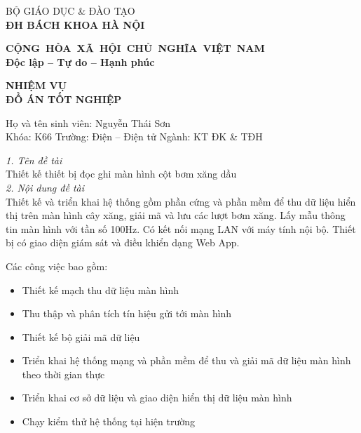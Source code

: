 \begin{multicols}{2}
\centering
\hspace{-3cm}BỘ GIÁO DỤC \& ĐÀO TẠO \\ \hspace{-3cm}\textbf{ĐH BÁCH KHOA HÀ NỘI}

\columnbreak

\hspace{-1.6cm}\textbf{CỘNG~HÒA~XÃ~HỘI~CHỦ~NGHĨA~VIỆT~NAM} \\ \hspace{-1.6cm}\textbf{Độc lập -- Tự do -- Hạnh phúc}

\end{multicols}

\begin{center}
   \textbf{NHIỆM VỤ \\ĐỒ ÁN TỐT NGHIỆP} 
\end{center}


\hspace{-1cm}Họ và tên sinh viên: Nguyễn Thái Sơn\\Khóa: K66 \hfill Trường: Điện -- Điện tử \hfill Ngành: KT ĐK \& TĐH
    
    
    \hspace{-1cm}\textit{1. Tên đề tài}\\
             Thiết kế thiết bị đọc ghi màn hình cột bơm xăng dầu  \\[0.2cm]
    \textit{2. Nội dung đề tài}\\
            Thiết kế và triển khai hệ thống gồm phần cứng và phần mềm
            để thu dữ liệu hiển thị trên màn hình cây xăng, giải mã
            và lưu các lượt bơm xăng. Lấy mẫu thông tin màn hình với tần số 100Hz. Có kết nối mạng LAN với máy tính nội bộ. Thiết bị có giao diện giám sát và điều khiển dạng Web App.

            Các công việc bao gồm:
            \begin{itemize}
                \item Thiết kế mạch thu dữ liệu màn hình
                \item Thu thập và phân tích tín hiệu gửi tới màn hình
                \item Thiết kế bộ giải mã dữ liệu
                \item Triển khai hệ thống mạng và phần mềm để thu và giải mã dữ liệu màn hình theo thời gian thực
                \item Triển khai cơ sở dữ liệu và giao diện hiển thị dữ liệu màn hình
                \item Chạy kiểm thử hệ thống tại hiện trường
            \end{itemize}
           
